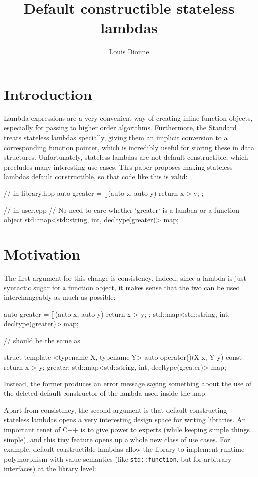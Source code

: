 \documentclass{wg21}
\title{Default constructible stateless lambdas}
\author{Louis Dionne}{ldionne.2@gmail.com}
\newcommand{\cc}[1]{\texttt{#1}}
\begin{document}
\maketitle

\section{Introduction}
Lambda expressions are a very convenient way of creating inline function objects,
especially for passing to higher order algorithms. Furthermore, the Standard
treats stateless lambdas specially, giving them an implicit conversion to a
corresponding function pointer, which is incredibly useful for storing these
in data structures. Unfortunately, stateless lambdas are not default constructible,
which precludes many interesting use cases. This paper proposes making stateless
lambdas default constructible, so that code like this is valid:

\begin{cpp}
// in library.hpp
auto greater = [](auto x, auto y) { return x > y; };

// in user.cpp
// No need to care whether `greater` is a lambda or a function object
std::map<std::string, int, decltype(greater)> map;
\end{cpp}


\section{Motivation}
The first argument for this change is consistency. Indeed, since a lambda is
just syntactic sugar for a function object, it makes sense that the two can be
used interchangeably as much as possible:

\begin{cpp}
auto greater = [](auto x, auto y) { return x > y; };
std::map<std::string, int, decltype(greater)> map;

// should be the same as

struct {
  template <typename X, typename Y>
  auto operator()(X x, Y y) const { return x > y; }
} greater;
std::map<std::string, int, decltype(greater)> map;
\end{cpp}

Instead, the former produces an error message saying something about the use
of the deleted default constructor of the lambda used inside the map.

Apart from consistency, the second argument is that default-constructing
stateless lambdas opens a very interesting design space for writing libraries.
An important tenet of C++ is to give power to experts (while keeping simple
things simple), and this tiny feature opens up a whole new class of use cases.
For example, default-constructible lambdas allow the \cite{Dyno} library to
implement runtime polymorphism with value semantics (like \cc{std::function},
but for arbitrary interfaces) at the library level:
\end{document}
